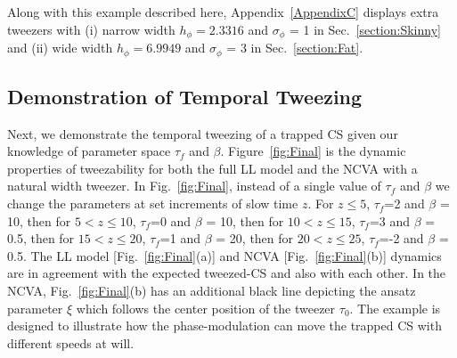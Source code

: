 \documentclass[aps,floatfix,showpacs,preprintnumbers,twocolumn,nofootinbib]{revtex4}
\begin{document}
Along with this example described here, Appendix~\ref{AppendixC} displays extra tweezers with (i) narrow width $h_\phi =2.3316$ and $\sigma_\phi$ = 1 in Sec.~\ref{section:Skinny} and (ii) wide width $h_\phi =6.9949$ and $\sigma_\phi$ = 3 in Sec.~\ref{section:Fat}.


\subsection{Demonstration of Temporal Tweezing}
 \label{section:FinalExample}
Next, we demonstrate the temporal tweezing of a trapped CS given our knowledge of parameter space $\tau_f$ and $\beta$.  Figure~\ref{fig:Final} is the dynamic properties of tweezability for both the full LL model and the NCVA with a natural width tweezer.  In Fig.~\ref{fig:Final}, instead of a single value of $\tau_f$ and $\beta$ we change the parameters at set increments of slow time $z$.  For $z\le5$, $\tau_f$=2 and $\beta$ = 10, then for $5 < z\le10$, $\tau_f$=0 and $\beta$ = 10, then for $10 < z\le15$, $\tau_f$=3 and $\beta$ = 0.5, then for $15 < z\le20$, $\tau_f$=1 and $\beta$ = 20, then for $20 < z\le25$, $\tau_f$=-2 and $\beta$ = 0.5.  The LL model [Fig.~\ref{fig:Final}(a)] and NCVA [Fig.~\ref{fig:Final}(b)] dynamics are in agreement with the expected tweezed-CS and also with each other.  In the NCVA, Fig.~\ref{fig:Final}(b) has an additional black line depicting the ansatz parameter $\xi$ which follows the center position of the tweezer $\tau_0$.  The example is designed to illustrate how the phase-modulation can move the trapped CS with different speeds at will.  
 
\end{document}
